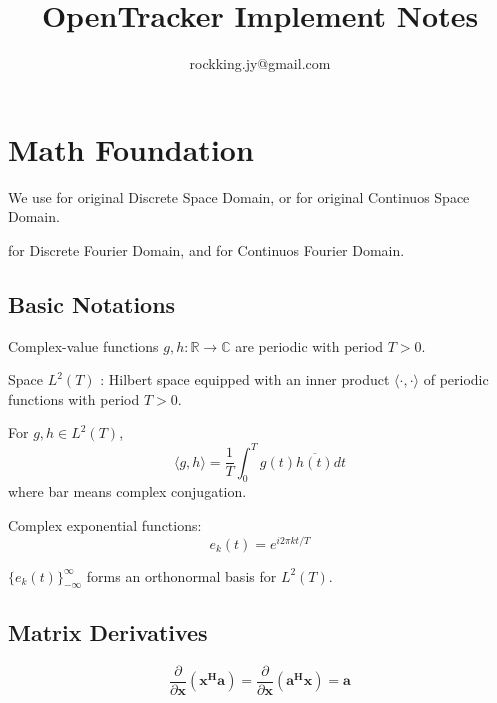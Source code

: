 \documentclass[12pt]{article}
\numberwithin{equation}{section}
\begin{document}
\small
\title{OpenTracker Implement Notes}
\author{rockking.jy@gmail.com}
\pagestyle{fancy}\fancyhf{}
\lhead{}
\lfoot{\textit{}}\cfoot{}\rfoot{\thepage}
\renewcommand{\headrulewidth}{1.pt}
\renewcommand{\footrulewidth}{1.pt}
\maketitle
\tableofcontents
\newpage
\section{Math Foundation}
We use  for original Discrete Space Domain,  or  for original Continuos Space Domain. \par
{} for Discrete Fourier Domain, and \bm{$\xi$} for Continuos Fourier Domain. 
\subsection{Basic Notations}
Complex-value functions $g, h: \mathbb{R} \rightarrow \mathbb{C}$ are periodic with period $T > 0$. \par
Space $L^2(T)$ : Hilbert space equipped with an inner product $\langle \cdot , \cdot \rangle$ of periodic functions with period $T>0$. \par
For $g, h \in L^2(T)$, 
\begin{equation}\label{eq:conj}
	\langle g,h \rangle = \frac{1}{T} \int^{T}_{0} g(t) \overline{h(t)} dt
\end{equation}
where bar means complex conjugation. \par
Complex exponential functions: 
\begin{equation}
	e_k(t) = e^{i 2\pi kt/T}
\end{equation} \par
$\{e_k(t)\}^{\infty}_{-\infty}$ forms an orthonormal basis for $L^2(T)$. \par

\subsection{Matrix Derivatives \cite{nasrabadi2007pattern}}
\begin{equation} \label{eq:matrixderivativ1}
	\frac{\partial}{\partial \bm{x}}(\bm{x^Ha}) = 
	\frac{\partial}{\partial \bm{x}}(\bm{a^Hx})= \bm{a}
\end{equation}
\end{document}

